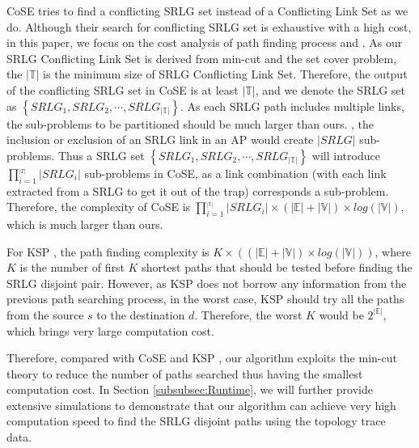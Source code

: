 CoSE tries to find a conflicting SRLG set instead of a Conflicting Link Set as we do. Although their search for conflicting SRLG set is exhaustive with a high cost, in this paper, we focus on the cost analysis of path finding process and . As our SRLG Conflicting Link Set is derived from min-cut and the set cover problem, the $|\mathbb{T}|$ is the minimum size of SRLG Conflicting Link Set. Therefore, the output of the conflicting SRLG set in CoSE is at least $|\mathbb{T}|$, and we denote the SRLG set as $\left\{ {SRL{G_1},SRL{G_2}, \cdots ,SRL{G_{|\mathbb{T}|}}} \right\}$. As each SRLG path includes multiple links, the sub-problems to be partitioned should be much larger than ours. , the inclusion or exclusion of an SRLG link in an AP would create  $|SRLG|$ sub-problems.  Thus a SRLG set $\left\{ {SRL{G_1},SRL{G_2}, \cdots ,SRL{G_{|\mathbb{T}|}}} \right\}$ will introduce $\prod\limits_{i = 1}^{_{\left| T \right|}} {\left| {SRL{G_i}} \right|}$ sub-problems in CoSE, as a link  combination (with each link extracted from a SRLG to get it out of the trap) corresponds  a sub-problem. Therefore, the complexity of CoSE  is $\prod\limits_{i = 1}^{_{|\mathbb{T}|}} {\left| {SRL{G_i}} \right|}\times (|\mathbb{E}|+|\mathbb{V}|)\times log(|\mathbb{V}|)$, which is much larger than ours.

For KSP \cite{eppstein1998finding}, the path finding complexity is $K\times ((|\mathbb{E}|+|\mathbb{V}|)\times log(|\mathbb{V}|))$, where $K$ is the number of first $K$ shortest paths that should be tested before finding the SRLG disjoint pair. However, as KSP does not borrow any information from the previous path searching process, in the worst case, KSP should try all the paths from the source $s$ to the destination $d$. Therefore, the worst $K$ would be  $2^{|\mathbb{E}|}$, which brings very large computation cost.

Therefore, compared with  CoSE \cite{rostami2007cose} and KSP \cite{eppstein1998finding}, our algorithm exploits the min-cut theory to reduce the number of paths searched thus having the smallest computation cost.  In Section \ref{subsubsec:Runtime}, we will further provide extensive simulations to demonstrate that our algorithm can achieve very high computation speed to find the SRLG disjoint paths using the topology trace data.
